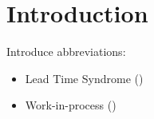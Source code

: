 \documentclass[mnsc]{informs3}
\begin{document}
\maketitle

%


\section{Introduction}
\label{sec:introduction}

Introduce abbreviations:
\begin{itemize}
\item Lead Time Syndrome (\LTS{})
\item Work-in-process (\WIP{})
\end{itemize}
\end{document}
